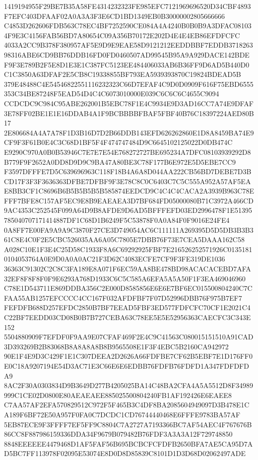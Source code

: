 \documentclass[UTF8,fontset=fandol,zihao=-4,a4paper]{ctexart}
\begin{document}
{{1419194955F29BE7B35A58FE4314232323FE985EFC7121969696520D34CBF4893F7EFC403DFAAF02A0A3A3F3E6CD1BD1349EB0B30000002805666666
C4853D262606FDB563C78EC4BF7252590CE084A4A4240B0B0B9A3DFAC081034F9E3C4156FAB56BD7A80654C09A356B70172E202D4E4E4EB86EFDFCFC
4033A2CC9B378F380957AF5E9D9E9EAE58D9121212EEDDBBF7EDDB371826398316ABE6CD9BB76DDB16FD0FD0460507AD99545B95A9A929DACE142BDE
F9F3E789B2F5E8D1E3E1C387FC5123EE484406033AB6B36FF9D6AD5B440D0C1C3850A63DFAF2E5CB8C19338855BF793EA5939393870C19824BDEAD5B
379E48488C4E54546822551116232323C66D7EFAF4C9D0D0909F616F75EBD6555353C34BE87248F5EAD54D4C4C6073010000E039C6C6C6C4655C9094
CCDCDC9C984C95ABE262001B5EBC78F1E4C9934E9D3AD16CC7A74E9DFAF3E78FF02BE1E1E16DDAB4A1F9BCBBBBFBAF5FBF40B76C18397224AED80B17
2E806684A4A7A78F1D3B16D7D2B66DDB143EFD626262860E1D8A8459BA74E9CF9F3F61B0E4C3C68D1BF5F4F474747484D9C6645102125022D0DB474C
E9290C970A0B0B53946C7E7E7E54E768272727BE695234A7DFC08103939292D8B779F9F2652A0DD8D9D9C9BA47A80BE3C78F177B6E972E5D5EBE7CC9
F3597DFFFE7D5C639696963C118F18B4A6A8D044AA222CB56BD7DEBE7D3BCD17F3F3F3636363DFBE7DFBF9F3E78C8C0C6403C7C5C555A952A57AF5EA
E8BB3CF1C8696B6B5B5B5B5B585874EEDCD9C4C4C4CACA2A3939B963C78EFFF7BFE8C157AF5EC9E8B9EAEAEA3D7BF684FD05000080B71C3972A466CD
9AC4353C252545F099A64D9B8AFDE9D6AD5BFFFEFD03ED2996478F1E51395785040707171414887DF1C68D1B6249F5C53878F0A0A84F0F9016E24FE4
0A8FF7E00FA9A9A9C3870F27CE3D749054AC6C111111A269395D5D5DB3B3B361C8E4C0F2E5CBC526035AA6A05C7805E7DBB76F73E7CEA5DAAA162C58
A028C10E1F3E4C25D58C1933F8A6C69292925FBF7E216526252571926C01351810104053764A0E9D0A0A0AC21F3D62C4083ECFE7CF9F3FE319DE1036
36363C91302C2C8C3FA189E8A071F6EC59AA8BE478BD98ACACACEBD7AFA32EF8F8F8F0F9E6293A768D1933C6C5C585A6EFA5A5A50F1F3EA469046960
C78E1D543711E869DDBA356C2E000D8585856E6E6E7BF6EC015500804240C7CFAA55AB1257EFCCCC4CC167F032AFDFBF7F07D52996DBB76F975B7EF7
FEFDFB688D257EFDC2850B7BF7EEAD5FBF3ED577FDFCFC70CF1E2021C4C22BF7EEDD03CD08B0B7B727CEBA63C78EE5E5E52956363CAECFC3C343E152
5504880909F7EFDF0F9AA9E07CFAF469F2E4C9C41563C080015151510A91CAD3D393269B2B83068B8A8A8A8B8B9565508E1F3F4EBC5B2160CA942972
90E1F4E9D3C429F1E1C307DEEA2D2626A66FDFBE7CF62B5EBF7E1D176FF0E0C18A9207194E54D3AC71E3C66E6E6EDBB76FDFB76FDFD1A347FDFDFDA9
8AC2F30A0303834D9B3649D277B4205025BA14C48BA2CFA4A5A5512D8F34989999C1CE02D0800E80AEAEAEE885025500804240FB1AF192426E6EAEE8
C7AA57AF2EFA570829512C972F5F465B3C4DF8BA2085604949097D3B478E1CA189F6BF72E50A957F0FA0C7DCDC1CD76744440468E6FFFE9783BA57AF
5EB87ECE9F3FFFF7EF5FF9C8804C7A2727A7193366BC7AF54AEC4F767676B86CC8F887986159336DDA34F9679B079482B76FDF3A3A3A12F729748850
8848EEEEEE4479468D1AF5FAF56B695BCBCFCFDFB2650BFA7AE5CA95D7AD5BC7FF113978F02095E53074E8D0D8D85839C8101D1D3D68D02062497ADE
}}
\end{document}
